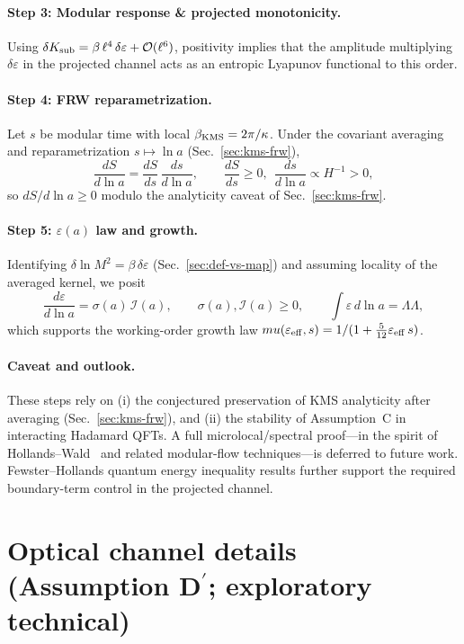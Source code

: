 \documentclass[aps,prd,onecolumn,superscriptaddress,nofootinbib]{revtex4-2}
\def\mu{mu}%
\def\Omega_\Lambda{OmegaLambda}%
\begin{document}
\paragraph{Step 3: Modular response \& projected monotonicity.}
Using \(\delta K_{\rm sub}=\beta\,\ell^4\,\delta\varepsilon+\mathcal O(\ell^6)\), positivity implies that the amplitude multiplying \(\delta\varepsilon\) in the projected channel acts as an entropic Lyapunov functional to this order.

\paragraph{Step 4: FRW reparametrization.}
Let \(s\) be modular time with local \(\beta_{\rm KMS}=2\pi/\kappa\). Under the covariant averaging and reparametrization \(s\mapsto \ln a\) (Sec.~\ref{sec:kms-frw}),
\[
\frac{dS}{d\ln a}=\frac{dS}{ds}\,\frac{ds}{d\ln a},\qquad \frac{dS}{ds}\ge 0,\ \ \frac{ds}{d\ln a}\propto H^{-1}>0,
\]
so \(dS/d\ln a\ge 0\) modulo the analyticity caveat of Sec.~\ref{sec:kms-frw}.

\paragraph{Step 5: \(\varepsilon(a)\) law and growth.}
Identifying \(\delta\ln M^2=\beta\,\delta\varepsilon\) (Sec.~\ref{sec:def-vs-map}) and assuming locality of the averaged kernel, we posit
\[
\frac{d\varepsilon}{d\ln a}=\sigma(a)\,\mathcal I(a),\qquad \sigma(a),\mathcal I(a)\ge 0,\qquad \int \varepsilon\,d\ln a=\Omega_\Lambda,
\]
which supports the working-order growth law \(\mu(\varepsilon_{\rm eff},s)=1/(1+\tfrac{5}{12}\varepsilon_{\rm eff}\,s)\).

\paragraph{Caveat and outlook.}
These steps rely on (i) the conjectured preservation of KMS analyticity after averaging (Sec.~\ref{sec:kms-frw}), and (ii) the stability of Assumption~C in interacting Hadamard QFTs. A full microlocal/spectral proof—in the spirit of Hollands–Wald~\cite{HollandsWald2001} and related modular-flow techniques—is deferred to future work. Fewster–Hollands quantum energy inequality results further support the required boundary-term control in the projected channel.

\section{Optical channel details (Assumption D\(^{\prime}\); exploratory technical)}
\label{app:optics-details}
\end{document}
